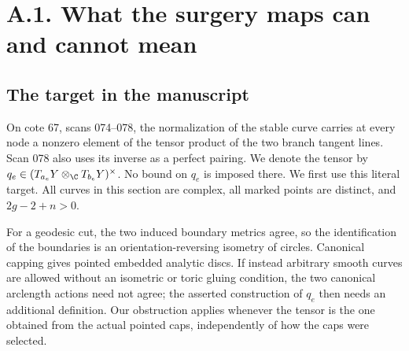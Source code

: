 \section{A.1. What the surgery maps can and cannot mean}
\subsection{The target in the manuscript}
On cote 67, scans 074--078, the normalization of the stable curve carries at every node a nonzero element of the tensor product of the two branch tangent lines. Scan 078 also uses its inverse as a perfect pairing. We denote the tensor by $q_e\in(T_{a_e}Y\otimes_{\C}T_{b_e}Y)^\times$. No bound on $q_e$ is imposed there. We first use this literal target. All curves in this section are complex, all marked points are distinct, and $2g-2+n>0$.

For a geodesic cut, the two induced boundary metrics agree, so the identification of the boundaries is an orientation-reversing isometry of circles. Canonical capping gives pointed embedded analytic discs. If instead arbitrary smooth curves are allowed without an isometric or toric gluing condition, the two canonical arclength actions need not agree; the asserted construction of $q_e$ then needs an additional definition. Our obstruction applies whenever the tensor is the one obtained from the actual pointed caps, independently of how the caps were selected.


